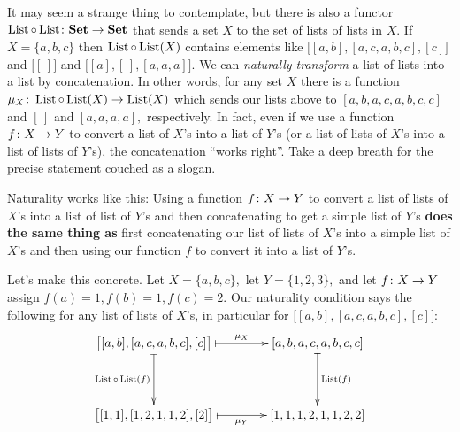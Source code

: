 \documentclass[../main/CT4S-EN-RU]{subfiles}
\begin{document}
\begin{blockENG}
It may seem a strange thing to contemplate, but there is also a functor $\operatorname{List}\circ\operatorname{List}\colon{\mathbf{Set}}\rightarrow{\mathbf{Set}}$ that sends a set $X$ to the set of lists of lists in $X.$ If $X=\{a,b,c\}$ then $\operatorname{List}\circ\operatorname{List}(X)$ contains elements like $\big[[a,b],[a,c,a,b,c],[c]\big]$ and $\big[[\,]\big]$ and $\big[[a],[\,],[a,a,a]\big].$ We can {\em naturally transform} a list of lists into a list by concatenation. In other words, for any set $X$ there is a function $\mu_X\colon\operatorname{List}\circ\operatorname{List}(X)\rightarrow\operatorname{List}(X)$ which sends our lists above to $[a,b,a,c,a,b,c,c]$ and $[\,]$ and $[a,a,a,a],$ respectively. In fact, even if we use a function $f\colon X\rightarrow Y$ to convert a list of $X$'s into a list of $Y$'s (or a list of lists of $X$'s into a list of lists of $Y$'s), the concatenation “works right”. Take a deep breath for the precise statement couched as a slogan.
\end{blockENG}

\begin{blockRUS}
\end{blockRUS}

\begin{sloganENG}
Naturality works like this: Using a function $f\colon X\rightarrow Y$ to convert a list of lists of $X$'s into a list of list of $Y$'s and then concatenating to get a simple list of $Y$'s {\bf does the same thing as} first concatenating our list of lists of $X$'s into a simple list of $X$'s and then using our function $f$ to convert it into a list of $Y$'s.
\end{sloganENG}

\begin{sloganRUS}
\end{sloganRUS}

\begin{blockENG}
Let's make this concrete. Let $X=\{a,b,c\},$ let $Y=\{1,2,3\},$ and let $f\colon X\rightarrow Y$ assign $f(a)=1, f(b)=1, f(c)=2.$ Our naturality condition says the following for any list of lists of $X$'s, in particular for $\big[[a,b],[a,c,a,b,c],[c]\big]$:
$$\xymatrix@=40pt{
\big[[a,b],[a,c,a,b,c],[c]\big]\ar@{|->}[r]^-{\mu_X}\ar@{|->}[d]_{\List\circ\List(f)}&[a,b,a,c,a,b,c,c]\ar@{|->}[d]^{\List(f)}\\
\big[[1,1],[1,2,1,1,2],[2]\big]\ar@{|->}[r]_-{\mu_Y}&[1,1,1,2,1,1,2,2]
}
$$
\end{blockENG}

\begin{blockRUS}
\end{blockRUS}
\end{document}
